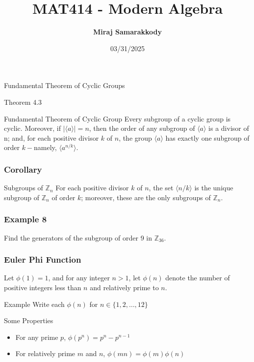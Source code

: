 \documentclass{beamer}
\title{MAT414 - Modern Algebra}
\author{\textbf{Miraj Samarakkody}}
\institute{Tougaloo College}
\date{03/31/2025}
\begin{document}
\begin{frame}
    \titlepage
\end{frame}



    \begin{frame}{}
    \begin{center}
        \Huge{Fundamental Theorem of Cyclic Groups}
    \end{center}
    \end{frame}

    \begin{frame}{Theorem 4.3}
    \begin{block}{Fundamental Theorem of Cyclic Group}
        Every subgroup of a cyclic group is cyclic. Moreover, if \(|\langle a \rangle|=n\), then  the order of any subgroup of \(\langle a\rangle\) is a divisor of n; and, for each positive divisor \(k\) of \(n\), the group \(\langle a\rangle\) has exactly one subgroup of order \(k-\)namely, \(\langle a^{n/k}\rangle\). 
    \end{block}
    \end{frame}

  

    \begin{frame}
        \frametitle{Corollary}
        \begin{block}{Subgroups of \(\mathbb{Z}_n\)}
        For each positive divisor \(k\) of \(n\), the set \(\langle n/k\rangle\) is the unique subgroup of \(\mathbb{Z}_n\) of order \(k\); moreover, these are the only subgroups of \(\mathbb{Z}_n\).    
        \end{block}
    \end{frame}



\begin{frame}
    \frametitle{Example 8}
Find the generators of the subgroup of order 9 in \(\mathbb{Z}_{36}\). 
    

\end{frame}


\begin{frame}
    \frametitle{Euler Phi Function}
Let \(\phi(1)=1\), and for any integer \(n>1\), let \(\phi(n)\) denote the number of positive integers less than \(n\) and relatively prime to \(n\). 

\begin{block}{Example} Write each \(\phi(n)\) for \(n \in \{1,2, \dots, 12\}\)
    
\end{block}


\begin{block}{Some Properties}
    \begin{itemize}
        \item For any prime \(p\), \(\phi(p^n)=p^n-p^{n-1}\)
        \item For relatively prime \(m\) and \(n\), \(\phi(mn)=\phi(m)\phi(n)\)
    \end{itemize}
\end{block}

    

\end{frame}
\end{document}
